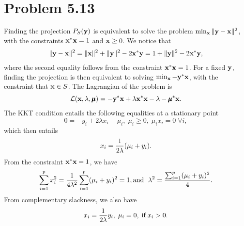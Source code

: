 \documentclass{scrartcl}
\begin{document}
\section*{Problem 5.13}

Finding the projection $P_S(\mathbf{y})$ is equivalent to solve the problem
$\min_{\mathbf{x}} \| \mathbf{y} - \mathbf{x} \|^2$, with the constraints $\mathbf{x}^*\mathbf{x} = 1$
and $\mathbf{x} \ge 0$. We notice that
\begin{equation}
\| \mathbf{y} - \mathbf{x} \|^2 = \|\mathbf{x}\|^2 + \|\mathbf{y}\|^2 - 2\mathbf{x}^*\mathbf{y}
= 1 + \|\mathbf{y}\|^2 -2 \mathbf{x}^*\mathbf{y} ,
\end{equation}
where the second equality follows from the constraint $\mathbf{x}^*\mathbf{x} = 1$.
For a fixed $\mathbf{y}$, finding the projection is then equivalent to solving
$\min_{\mathbf{x}}-\mathbf{y}^*\mathbf{x}$, with the constraint that $\mathbf{x} \in S$.
The Lagrangian of the problem is
\begin{equation}
    \mathcal{L}(\mathbf{x}, \lambda, \pmb{\mu})
    = -\mathbf{y}^*\mathbf{x} + \lambda \mathbf{x}^*\mathbf{x} - \lambda - \pmb{\mu}^*\mathbf{x} .
\end{equation}
The KKT condition entails the following equalities at a stationary point
\begin{equation}
0 = -y_i + 2\lambda x_i - \mu_i, \; \mu_i \ge 0, \; \mu_i x_i = 0 \; \forall i ,
\end{equation}
which then entails
\begin{equation}
    x_i = {1 \over {2\lambda}} (\mu_i + y_i).
    \label{eqn:xi_513}
\end{equation}
From the constraint $\mathbf{x}^*\mathbf{x} = 1$, we have
\begin{equation}
    \sum_{i=1}^p x_i^2 = {1 \over 4\lambda^2} \sum_{i=1}^p (\mu_i + y_i)^2 = 1,
    \text{and \;} \lambda^2 = {\sum_{i=1}^p (\mu_i + y_i)^2 \over 4}.
\end{equation}
From complementary slackness, we also have
\begin{equation}
    x_i = {1 \over 2\lambda} y_i, \; \mu_i = 0, \; \text{if\;} x_i > 0.
    \label{eqn:cs_513}
\end{equation}
\end{document}
